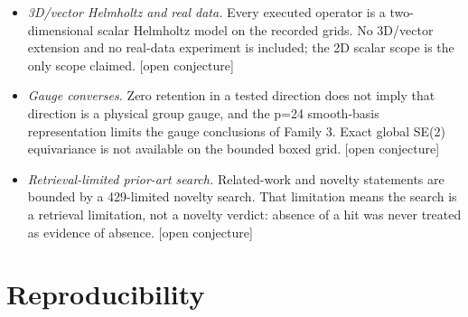 \documentclass[12pt]{article}
\newcommand{\OPN}{\textnormal{[open conjecture]}}
\begin{document}
\begin{itemize}
norm vanishes as $O(|s|)$, noise and prior scaling become decisive, and the
strict no-prior projector is discontinuous at $s=0$. Extending this statement
to a statistical local-asymptotic regime, a semidefinite prior, or the
continuum full-wave model remains open. \OPN{}
\item \emph{3D/vector Helmholtz and real data.} Every executed operator is a
two-dimensional scalar Helmholtz model on the recorded grids. No 3D/vector
extension and no real-data experiment is included; the 2D scalar scope is the
only scope claimed. \OPN{}
\item \emph{Gauge converses.} Zero retention in a tested direction does not
imply that direction is a physical group gauge, and the p=24 smooth-basis
representation limits the gauge conclusions of Family 3. Exact global SE(2)
equivariance is not available on the bounded boxed grid. \OPN{}
\item \emph{Retrieval-limited prior-art search.} Related-work and novelty
statements are bounded by a 429-limited novelty search. That limitation means
the search is a retrieval limitation, not a novelty verdict: absence of a hit
was never treated as evidence of absence. \OPN{}
\end{itemize}

\section{Reproducibility}\label{sec:repro}
\end{document}

